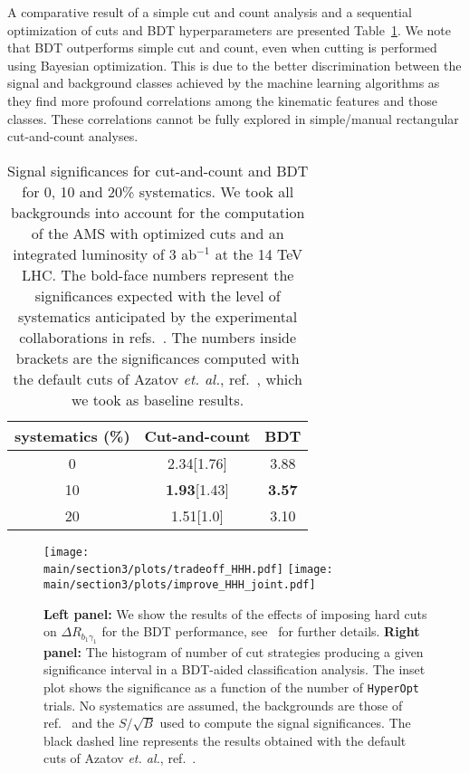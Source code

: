 A comparative result of a simple cut and count analysis and a sequential optimization of cuts and BDT hyperparameters are presented  Table~\ref{table:resultsbdtKS}. We note that BDT outperforms simple cut and count, even when cutting is performed using Bayesian optimization. This is due to the better discrimination between the signal and background classes achieved by the machine learning algorithms as they find more profound correlations among the kinematic features and those classes. These correlations cannot be fully explored in simple/manual rectangular cut-and-count analyses. 

%
\begin{table}[h]
\centering
\begin{tabular}{c|c|c}
\hline
systematics (\%) & Cut-and-count & BDT \\
\hline\hline 
0 & 2.34[1.76] & 3.88 \\
\hline
10 & {\bf 1.93}[1.43] & {\bf 3.57}  \\
\hline
20 & 1.51[1.0] & 3.10  \\
\hline\hline
\end{tabular}
\caption{Signal significances for cut-and-count and BDT for 0, 10 and 20\% systematics. We took all backgrounds into account for the computation of the AMS with optimized cuts and an integrated luminosity of 3 ab$^{-1}$ at the 14 TeV LHC. The bold-face numbers represent the significances expected with the level of systematics anticipated by the experimental collaborations in refs.~\cite{ATLAS14, ATLAS17, CMS}. The numbers inside brackets are the significances computed with the default cuts of Azatov \emph{et. al.}, ref.~\cite{Azatov:2015oxa}, which we took as baseline results.}
\label{table:resultsbdtKS}
\end{table}
%
%
\begin{figure}[!t]
\centering
\texttt{[image: \\main/section3/plots/tradeoff\_HHH.pdf]}
\texttt{[image: \\main/section3/plots/improve\_HHH\_joint.pdf]}
\caption{\textbf{Left panel:}  We show the results of the effects of imposing hard cuts on $\Delta R_{b_1\gamma_1}$ for the BDT performance, see~\cite{Alves:2017ued} for further details. \textbf{Right panel:} The histogram of number of cut strategies producing a given significance interval in a BDT-aided classification analysis. The inset plot shows the significance as a function of the number of \texttt{HyperOpt} trials. No systematics are assumed, the backgrounds are those of ref.~\cite{Azatov:2015oxa} and the $S/\sqrt{B}$ used to compute the signal significances. The black dashed line represents the results obtained with the default cuts of Azatov \emph{et. al.}, ref.~\cite{Azatov:2015oxa}.}
\label{fig:8resultsKS}
\end{figure}
